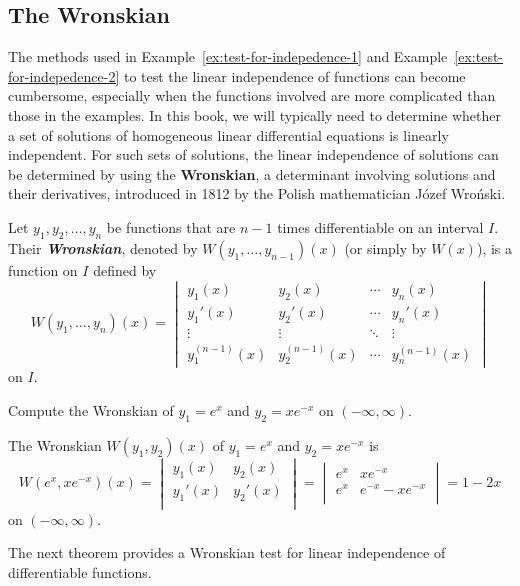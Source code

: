 \subsection{The Wronskian}
The methods used in Example~\ref{ex:test-for-indepedence-1} and Example~\ref{ex:test-for-indepedence-2} to test the linear independence of functions can become cumbersome, especially when the functions involved are more complicated than those in the examples. In this book, we will typically need to determine whether a  set of solutions of    homogeneous linear differential equations is linearly independent.  For such  sets of solutions, the linear independence of  solutions  can be determined by using the \textbf{Wronskian}, a determinant involving solutions and their derivatives,  introduced in 1812 by  the Polish mathematician Józef Wroński. 
\begin{definition}[Wronskian]\label{defn:wronskian}
Let  $y_1, y_2, \dots, y_n$ be functions that are $n-1$ times differentiable on an interval $I.$
  Their  \textbf{\textit{Wronskian}}, denoted by \(W(y_1, \dots, y_{n-1})(x)\) (or simply by $W(x)$),   is a function on $I$ defined by
\[
W(y_1,\dots,y_n)(x)
=
\begin{vmatrix}
	y_1(x) & y_2(x) & \cdots & y_n(x)\\
	y_1'(x) & y_2'(x) & \cdots & y_n'(x)\\
	\vdots & \vdots & \ddots & \vdots\\
	y_1^{(n-1)}(x) & y_2^{(n-1)}(x) & \cdots & y_n^{(n-1)}(x)
\end{vmatrix}
\] on \(I.\)
\end{definition}

\begin{example}\label{eg:wronskian-0}
	Compute the Wronskian of \(y_1=e^x\) and $y_2=xe^{-x}$ on 
\((-\infty, \infty).\)
\end{example}
\begin{solution}
	The Wronskian \(W(y_1,y_2)(x)\) of \(y_1=e^x\) and $y_2=xe^{-x}$ is 
	\[
	 W(e^x,xe^{-x})(x)
	=
	\begin{vmatrix}
		y_1(x) & y_2(x) \\
		y_1'(x) & y_2'(x) \\
		\end{vmatrix}
			= \begin{vmatrix}
				e^x & xe^{-x} \\
				e^x & e^{-x}-xe^{-x} \\
			\end{vmatrix}
			 = 1-2x\] on \((-\infty, \infty).\)
\end{solution}
The next theorem provides a Wronskian test for linear independence of differentiable functions.

